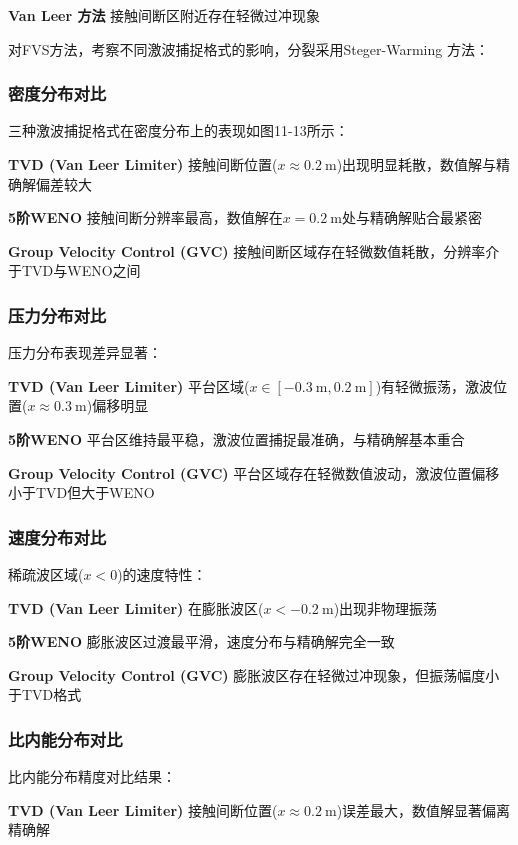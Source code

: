 \documentclass[12pt,a4paper]{article}
\begin{document}
\textbf{Van Leer 方法}
接触间断区附近存在轻微过冲现象

对FVS方法，考察不同激波捕捉格式的影响，分裂采用Steger-Warming 方法：

\subsubsection{密度分布对比}
三种激波捕捉格式在密度分布上的表现如图11-13所示：

\textbf{TVD (Van Leer Limiter)} 
接触间断位置($x \approx \SI{0.2}{\meter}$)出现明显耗散，数值解与精确解偏差较大

\textbf{5阶WENO} 
接触间断分辨率最高，数值解在$x = \SI{0.2}{\meter}$处与精确解贴合最紧密

\textbf{Group Velocity Control (GVC)} 
接触间断区域存在轻微数值耗散，分辨率介于TVD与WENO之间

\subsubsection{压力分布对比}
压力分布表现差异显著：

\textbf{TVD (Van Leer Limiter)} 
平台区域($x \in [\SI{-0.3}{\meter}, \SI{0.2}{\meter}]$)有轻微振荡，激波位置($x \approx \SI{0.3}{\meter}$)偏移明显

\textbf{5阶WENO} 
平台区维持最平稳，激波位置捕捉最准确，与精确解基本重合

\textbf{Group Velocity Control (GVC)} 
平台区域存在轻微数值波动，激波位置偏移小于TVD但大于WENO

\subsubsection{速度分布对比}
稀疏波区域($x < 0$)的速度特性：

\textbf{TVD (Van Leer Limiter)} 
在膨胀波区($x < \SI{-0.2}{\meter}$)出现非物理振荡

\textbf{5阶WENO} 
膨胀波区过渡最平滑，速度分布与精确解完全一致

\textbf{Group Velocity Control (GVC)} 
膨胀波区存在轻微过冲现象，但振荡幅度小于TVD格式

\subsubsection{比内能分布对比}
比内能分布精度对比结果：

\textbf{TVD (Van Leer Limiter)} 
接触间断位置($x \approx \SI{0.2}{\meter}$)误差最大，数值解显著偏离精确解
\end{document}
